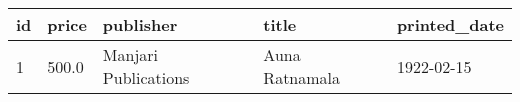 \begin{longtable}[]{@{}lllll@{}}
\toprule
id & price & publisher & title & printed\_date\\
\midrule
\endhead
1 & 500.0 & Manjari Publications & Auna Ratnamala & 1922-02-15 \\
\bottomrule
\end{longtable}
